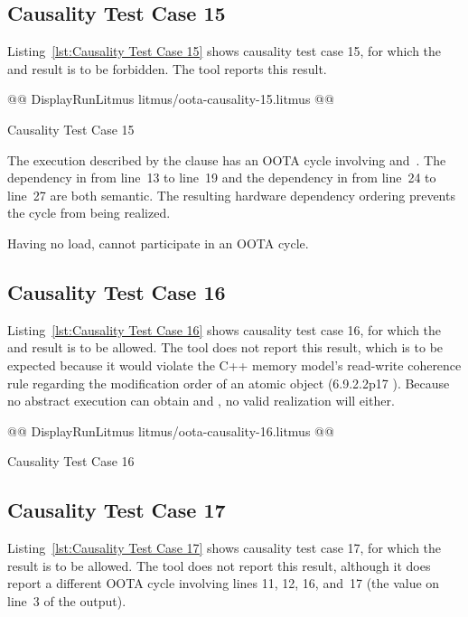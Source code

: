 \documentclass[10]{article}
\begin{document}
\subsection{Causality Test Case 15}
\label{app:Causality Test Case 15}

Listing~\ref{lst:Causality Test Case 15}
shows causality test case 15, for which the 
and 
result is to be forbidden.
The  tool reports this result.

\begin{listing}[tbp]
@@ DisplayRunLitmus litmus/oota-causality-15.litmus @@
\caption{Causality Test Case 15}
\label{lst:Causality Test Case 15}
\end{listing}

The execution described by the  clause
has an OOTA cycle involving  and~.
The dependency in  from line~13 to line~19 and the dependency
in  from line~24 to line~27 are both semantic.
The resulting hardware dependency ordering prevents the cycle from
being realized.

Having no load,  cannot participate in an OOTA cycle.

\subsection{Causality Test Case 16}
\label{app:Causality Test Case 16}

Listing~\ref{lst:Causality Test Case 16}
shows causality test case 16, for which the  and 
result is to be allowed.
The  tool does not report this result, which is to be
expected because it would violate the C++ memory model's read-write
coherence rule regarding the modification order of an atomic object
(6.9.2.2p17 ).
Because no abstract execution can obtain  and , no
valid realization will either.

\begin{listing}[tbp]
@@ DisplayRunLitmus litmus/oota-causality-16.litmus @@
\caption{Causality Test Case 16}
\label{lst:Causality Test Case 16}
\end{listing}

\subsection{Causality Test Case 17}
\label{app:Causality Test Case 17}

Listing~\ref{lst:Causality Test Case 17}
shows causality test case 17, for which the 
result is to be allowed.
The  tool does not report this result, although it does
report a different OOTA cycle involving lines 11, 12, 16, and~17
(the  value on line~3 of the  output).
\end{document}
